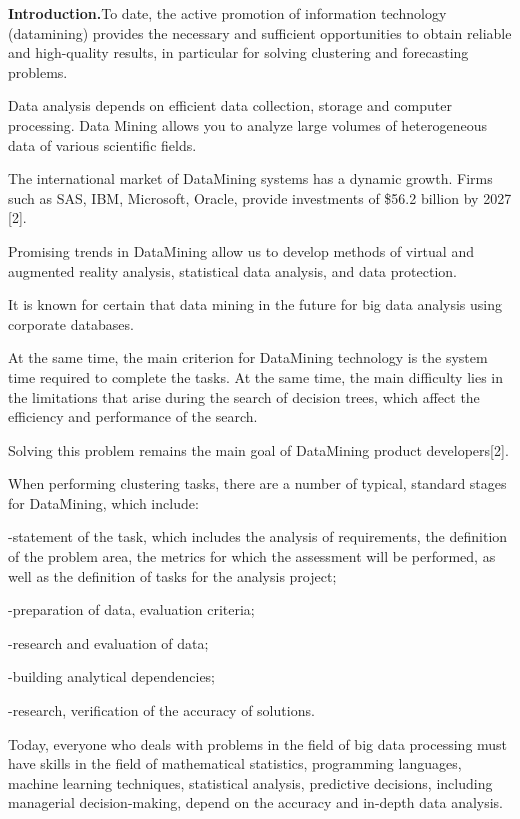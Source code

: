 \begin{multicols}{2}
{\bfseries Introduction.}To date, the active promotion of information
technology (datamining) provides the necessary and sufficient
opportunities to obtain reliable and high-quality results, in particular
for solving clustering and forecasting problems.

Data analysis depends on efficient data collection, storage and computer
processing. Data Mining allows you to analyze large volumes of
heterogeneous data of various scientific fields.

The international market of DataMining systems has a dynamic growth.
Firms such as SAS, IBM, Microsoft, Oracle, provide investments of \$56.2
billion by 2027 {[}2{]}.

Promising trends in DataMining allow us to develop methods of virtual
and augmented reality analysis, statistical data analysis, and data
protection.

It is known for certain that data mining in the future for big data
analysis using corporate databases.

At the same time, the main criterion for DataMining technology is the
system time required to complete the tasks. At the same time, the main
difficulty lies in the limitations that arise during the search of
decision trees, which affect the efficiency and performance of the
search.

Solving this problem remains the main goal of DataMining product
developers{[}2{]}.

When performing clustering tasks, there are a number of typical,
standard stages for DataMining, which include:

-statement of the task, which includes the analysis of requirements, the
definition of the problem area, the metrics for which the assessment
will be performed, as well as the definition of tasks for the analysis
project;

-preparation of data, evaluation criteria;

-research and evaluation of data;

-building analytical dependencies;

-research, verification of the accuracy of solutions.

Today, everyone who deals with problems in the field of big data
processing must have skills in the field of mathematical statistics,
programming languages, machine learning techniques, statistical
analysis, predictive decisions, including managerial decision-making,
depend on the accuracy and in-depth data analysis.


\end{multicols}
